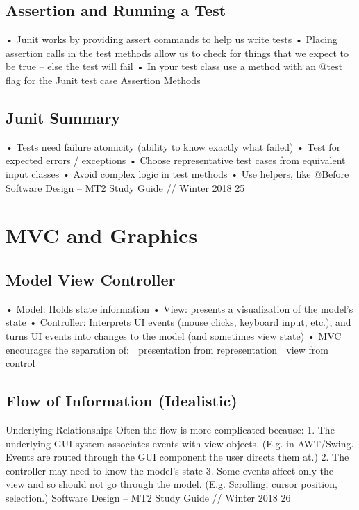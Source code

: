 \documentclass[11pt]{article}
\begin{document}
{{\subsection{Assertion and Running a Test}
• Junit works by providing assert commands to help us write tests
• Placing assertion calls in the test methods allow us to check for things that we expect to be true –
else the test will fail
• In your test class use a method with an @test flag for the Junit test case
Assertion Methods
\subsection{Junit Summary}
• Tests need failure atomicity (ability to know exactly what failed)
• Test for expected errors / exceptions
• Choose representative test cases from equivalent input classes
• Avoid complex logic in test methods
• Use helpers, like @Before
Software Design – MT2 Study Guide // Winter 2018 25
\section{MVC and Graphics}
\subsection{Model View Controller}
• Model: Holds state information
• View: presents a visualization of the model’s state
• Controller: Interprets UI events (mouse clicks, keyboard input, etc.), and turns UI events into
changes to the model (and sometimes view state)
• MVC encourages the separation of:
 presentation from representation
 view from control
\subsection{Flow of Information (Idealistic)}
Underlying Relationships
Often the flow is more complicated because:
1. The underlying GUI system associates events with view objects. (E.g. in AWT/Swing. Events are
routed through the GUI component the user directs them at.)
2. The controller may need to know the model’s state
3. Some events affect only the view and so should not go through the model. (E.g. Scrolling, cursor
position, selection.)
Software Design – MT2 Study Guide // Winter 2018 26
}}
\end{document}
